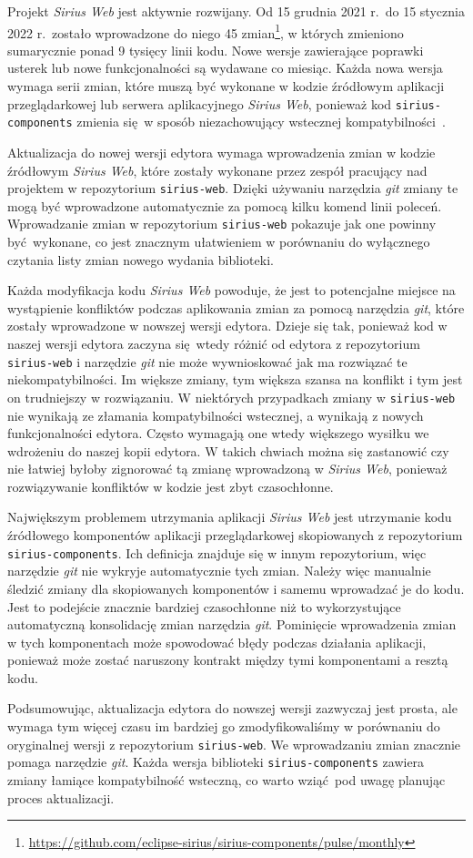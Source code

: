 Projekt \emph{Sirius Web} jest aktywnie rozwijany. Od 15 grudnia 2021 r.\ do 15
stycznia 2022 r.\ zostało wprowadzone do niego 45 zmian\footnote{
	\url{https://github.com/eclipse-sirius/sirius-components/pulse/monthly}
}, w których zmieniono sumarycznie ponad 9 tysięcy linii kodu.
Nowe wersje zawierające poprawki usterek lub nowe funkcjonalności są wydawane
co miesiąc. Każda nowa wersja wymaga serii zmian, które muszą być wykonane
w kodzie źródłowym aplikacji przeglądarkowej lub serwera aplikacyjnego
\emph{Sirius Web}, ponieważ kod \texttt{sirius-components} zmienia się w sposób
niezachowujący wstecznej kompatybilności~\cite{sirius-components-changelog}.

Aktualizacja do nowej wersji edytora wymaga wprowadzenia zmian w kodzie
źródłowym \emph{Sirius Web}, które zostały wykonane przez zespół pracujący nad
projektem w repozytorium \texttt{sirius-web}. Dzięki używaniu narzędzia
\emph{git} zmiany te mogą być wprowadzone automatycznie za pomocą kilku komend
linii poleceń. Wprowadzanie zmian w repozytorium \texttt{sirius-web} pokazuje
jak one powinny być wykonane, co jest znacznym ułatwieniem w porównaniu do
wyłącznego czytania listy zmian nowego wydania biblioteki.

Każda modyfikacja kodu \emph{Sirius Web} powoduje, że jest to potencjalne
miejsce na wystąpienie konfliktów podczas aplikowania zmian za pomocą narzędzia
\emph{git}, które zostały wprowadzone w nowszej wersji edytora.
Dzieje się tak, ponieważ kod w naszej wersji edytora zaczyna się wtedy różnić
od edytora z repozytorium \texttt{sirius-web} i narzędzie \emph{git} nie może
wywnioskować jak ma rozwiązać te niekompatybilności.
Im większe zmiany, tym większa szansa na konflikt i tym jest on trudniejszy w
rozwiązaniu.
W niektórych przypadkach zmiany w \texttt{sirius-web} nie wynikają ze złamania
kompatybilności wstecznej, a wynikają z nowych funkcjonalności edytora. Często
wymagają one wtedy większego wysiłku we wdrożeniu do naszej kopii edytora.
W takich chwiach można się zastanowić czy nie łatwiej byłoby zignorować tą
zmianę wprowadzoną w \emph{Sirius Web}, ponieważ rozwiązywanie konfliktów w
kodzie jest zbyt czasochłonne.

Największym problemem utrzymania aplikacji \emph{Sirius Web} jest utrzymanie
kodu źródłowego komponentów aplikacji przeglądarkowej skopiowanych z
repozytorium \texttt{sirius-components}. Ich definicja znajduje się w innym
repozytorium, więc narzędzie \emph{git} nie wykryje automatycznie tych zmian.
Należy więc manualnie śledzić zmiany dla skopiowanych komponentów i samemu
wprowadzać je do kodu. Jest to podejście znacznie bardziej czasochłonne
niż to wykorzystujące automatyczną konsolidację zmian narzędzia \emph{git}.
Pominięcie wprowadzenia zmian w tych komponentach może spowodować błędy podczas
działania aplikacji, ponieważ może zostać naruszony kontrakt między tymi
komponentami a resztą kodu.

Podsumowując, aktualizacja edytora do nowszej wersji zazwyczaj jest prosta, ale
wymaga tym więcej czasu im bardziej go zmodyfikowaliśmy w porównaniu do
oryginalnej wersji z repozytorium \texttt{sirius-web}. We wprowadzaniu zmian
znacznie pomaga narzędzie \emph{git}. Każda wersja biblioteki
\texttt{sirius-components} zawiera zmiany łamiące kompatybilność wsteczną, co
warto wziąć pod uwagę planując proces aktualizacji.
